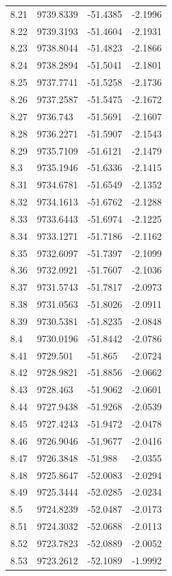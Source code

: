 \begin{table}[H]
\begin{tabular}{llll}
8.21 & 9739.8339 & -51.4385 & -2.1996 \\
8.22 & 9739.3193 & -51.4604 & -2.1931 \\
8.23 & 9738.8044 & -51.4823 & -2.1866 \\
8.24 & 9738.2894 & -51.5041 & -2.1801 \\
8.25 & 9737.7741 & -51.5258 & -2.1736 \\
8.26 & 9737.2587 & -51.5475 & -2.1672 \\
8.27 & 9736.743 & -51.5691 & -2.1607 \\
8.28 & 9736.2271 & -51.5907 & -2.1543 \\
8.29 & 9735.7109 & -51.6121 & -2.1479 \\
8.3 & 9735.1946 & -51.6336 & -2.1415 \\
8.31 & 9734.6781 & -51.6549 & -2.1352 \\
8.32 & 9734.1613 & -51.6762 & -2.1288 \\
8.33 & 9733.6443 & -51.6974 & -2.1225 \\
8.34 & 9733.1271 & -51.7186 & -2.1162 \\
8.35 & 9732.6097 & -51.7397 & -2.1099 \\
8.36 & 9732.0921 & -51.7607 & -2.1036 \\
8.37 & 9731.5743 & -51.7817 & -2.0973 \\
8.38 & 9731.0563 & -51.8026 & -2.0911 \\
8.39 & 9730.5381 & -51.8235 & -2.0848 \\
8.4 & 9730.0196 & -51.8442 & -2.0786 \\
8.41 & 9729.501 & -51.865 & -2.0724 \\
8.42 & 9728.9821 & -51.8856 & -2.0662 \\
8.43 & 9728.463 & -51.9062 & -2.0601 \\
8.44 & 9727.9438 & -51.9268 & -2.0539 \\
8.45 & 9727.4243 & -51.9472 & -2.0478 \\
8.46 & 9726.9046 & -51.9677 & -2.0416 \\
8.47 & 9726.3848 & -51.988 & -2.0355 \\
8.48 & 9725.8647 & -52.0083 & -2.0294 \\
8.49 & 9725.3444 & -52.0285 & -2.0234 \\
8.5 & 9724.8239 & -52.0487 & -2.0173 \\
8.51 & 9724.3032 & -52.0688 & -2.0113 \\
8.52 & 9723.7823 & -52.0889 & -2.0052 \\
8.53 & 9723.2612 & -52.1089 & -1.9992 \\

\end{tabular}
\end{table}
